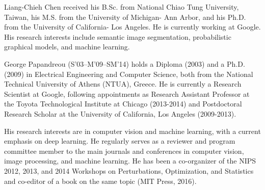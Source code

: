 % 

\begin{IEEEbiography}{Liang-Chieh Chen}
received his B.Sc. from National Chiao Tung University, Taiwan, his M.S. from the University of Michigan- Ann Arbor, and his
Ph.D. from the University of California- Los Angeles. He is currently working at Google. His research interests
include semantic image segmentation, probabilistic graphical models, and machine learning.
\end{IEEEbiography}

\begin{IEEEbiography}{George Papandreou}
(S'03--M'09--SM'14) holds a Diploma (2003) and a Ph.D. (2009) in Electrical
Engineering and Computer Science, both from the National Technical University
of Athens (NTUA), Greece. He is currently a Research Scientist at Google,
following appointments as Research Assistant Professor at the Toyota
Technological Institute at Chicago (2013-2014) and Postdoctoral Research Scholar
at the University of California, Los Angeles (2009-2013).

His research interests are in computer vision and machine learning, with a
current emphasis on deep learning. He regularly serves as a reviewer and
program committee member to the main journals and conferences in computer
vision, image processing, and machine learning. He has been a co-organizer of
the NIPS 2012, 2013, and 2014 Workshops on Perturbations, Optimization, and
Statistics and co-editor of a book on the same topic (MIT Press, 2016).
\end{IEEEbiography}

